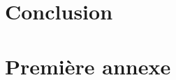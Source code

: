 \documentclass[10pt,a4paper]{article}
\numberwithin{equation}{section}
\begin{document}
\section*{Conclusion}


\newpage
\appendix
\section{Première annexe} \label{annexe_fonctionnelles}


\newpage

 
\end{document}
